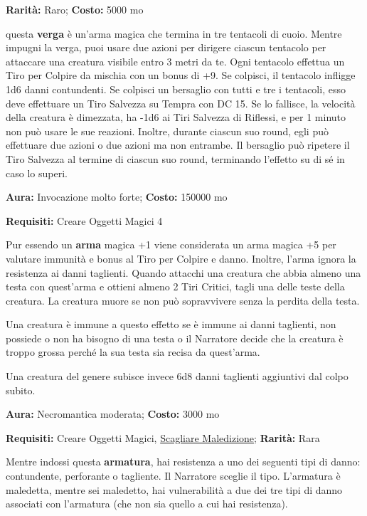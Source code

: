 \begin{multicols}{2}

\textbf{Rarità:} Raro; \textbf{Costo:} 5000 mo

questa \textbf{verga} è un'arma magica che termina in tre tentacoli di cuoio. Mentre impugni la verga, puoi usare due azioni per dirigere ciascun tentacolo per attaccare una creatura visibile entro 3 metri da te. Ogni tentacolo effettua un Tiro per Colpire da mischia con un bonus di +9. Se colpisci, il tentacolo infligge 1d6 danni contundenti. Se colpisci un bersaglio con tutti e tre i tentacoli, esso deve effettuare un Tiro Salvezza su Tempra con DC 15. Se lo fallisce, la velocità della creatura è dimezzata, ha -1d6 ai Tiri Salvezza di Riflessi, e per 1 minuto non può usare le sue reazioni. Inoltre, durante ciascun suo round, egli può effettuare due azioni o due azioni ma non entrambe. Il bersaglio può ripetere il Tiro Salvezza al termine di ciascun suo round, terminando l'effetto su di sé in caso lo superi.


\textbf{Aura:} Invocazione molto forte; \textbf{Costo:} 150000 mo

\textbf{Requisiti:} Creare Oggetti Magici 4

Pur essendo un \textbf{arma} magica +1 viene considerata un arma magica +5 per valutare immunità e bonus al Tiro per Colpire e danno. Inoltre, l'arma ignora la resistenza ai danni taglienti. Quando attacchi una creatura che abbia almeno una testa con quest'arma e ottieni almeno 2 Tiri Critici, tagli una delle teste della creatura. La creatura muore se non può sopravvivere senza la perdita della testa.

Una creatura è immune a questo effetto se è immune ai danni taglienti, non possiede o non ha bisogno di una testa o il Narratore decide che la creatura è troppo grossa perché la sua testa sia recisa da quest'arma.

Una creatura del genere subisce invece 6d8 danni taglienti aggiuntivi dal colpo subito.


\textbf{Aura:} Necromantica moderata; \textbf{Costo:} 3000 mo

\textbf{Requisiti:} Creare Oggetti Magici, \hyperlink{Scagliare Maledizione}{Scagliare Maledizione}; \textbf{Rarità:} Rara

Mentre indossi questa \textbf{armatura}, hai resistenza a uno dei seguenti tipi di danno: contundente, perforante o tagliente. Il Narratore sceglie il tipo. L'armatura è maledetta, mentre sei maledetto, hai vulnerabilità a due dei tre tipi di danno associati con l'armatura (che non sia quello a cui hai resistenza).


\end{multicols}
